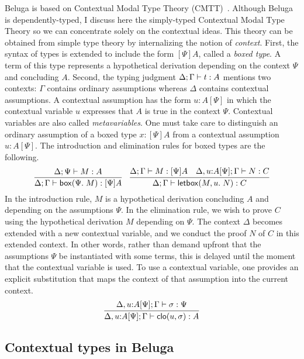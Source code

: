 Beluga is based on Contextual Modal Type Theory (CMTT)~\cite{Nanevski:ICML05}.
Although Beluga is dependently-typed, I discuss here the simply-typed Contextual
Modal Type Theory so we can concentrate solely on the contextual ideas.
This theory can be obtained from simple type theory by internalizing the notion
of \emph{context}.
First, the syntax of types is extended to include the form $[\Psi]A$, called a
\emph{boxed type}.
A term of this type represents a hypothetical derivation depending on the
context $\Psi$ and concluding $A$.
Second, the typing judgment $\Delta; \Gamma \vdash t : A$ mentions two
contexts:
$\Gamma$ contains ordinary assumptions whereas $\Delta$ contains contextual
assumptions.
A contextual assumption has the form $u : A[\Psi]$ in which the
contextual variable $u$ expresses that $A$ is true in the context $\Psi$.
Contextual variables are also called \emph{metavariables}.
One must take care to distinguish an ordinary assumption of a boxed type
$x : [\Psi]A$ from a contextual assumption $u : A[\Psi]$.
The introduction and elimination rules for boxed types are the following.
\[
  \infer{%
    \Delta; \Gamma \proves \mathsf{box}(\Psi.\; M) : [\Psi]A
  }{%
    \Delta; \Psi \proves M : A
  }
  \quad
  \infer{%
    \Delta; \Gamma \proves \mathsf{letbox}(M, u.\; N) : C
  }{%
    \Delta; \Gamma \proves M : [\Psi]A
    &
    \Delta, u{:}A[\Psi]; \Gamma \proves N : C
  }
\]
In the introduction rule, $M$ is a hypothetical derivation concluding $A$ and
depending on the assumptions $\Psi$.
In the elimination rule, we wish to prove $C$ using the hypothetical derivation
$M$ depending on $\Psi$. The context $\Delta$ becomes extended with a new
contextual variable, and we conduct the proof $N$ of $C$ in this extended
context.
In other words, rather than demand upfront that the assumptions $\Psi$ be
instantiated with some terms, this is delayed until the moment that the
contextual variable is used. To use a contextual variable, one provides an
explicit substitution that maps the context of that assumption into the current
context.
\[
  \infer{%
    \Delta, u{:}A[\Psi]; \Gamma \proves \mathsf{clo}(u, \sigma) : A
  }{%
    \Delta, u{:}A[\Psi]; \Gamma \proves \sigma : \Psi
  }
\]

\subsection{Contextual types in Beluga}

